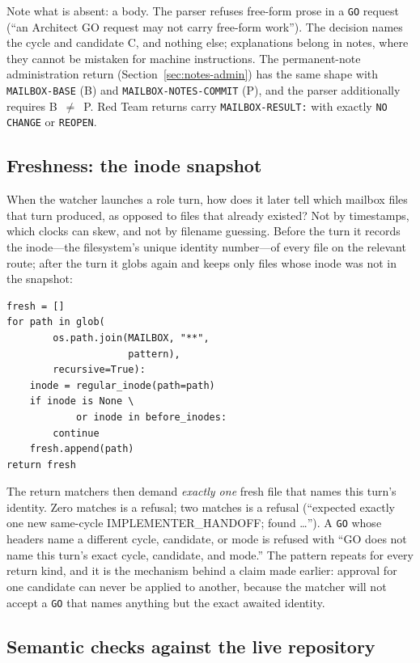 \documentclass[10pt,aps,prd,twocolumn,nofootinbib]{revtex4-2}
\newcommand{\code}[1]{\texttt{#1}}
\begin{document}
Note what is absent: a body.  The parser refuses free-form prose in a
\code{GO} request (``an Architect GO request may not carry free-form
work'').  The decision names the cycle and candidate C, and nothing
else; explanations belong in notes, where they cannot be mistaken for
machine instructions.  The permanent-note administration return
(Section~\ref{sec:notes-admin}) has the same shape with
\code{MAILBOX-BASE} (B) and \code{MAILBOX-NOTES-COMMIT} (P), and the
parser additionally requires B~$\neq$~P.  Red Team returns carry
\code{MAILBOX-RESULT:} with exactly \code{NO CHANGE} or \code{REOPEN}.

\subsection{Freshness: the inode snapshot}

When the watcher launches a role turn, how does it later tell which
mailbox files that turn produced, as opposed to files that already
existed?  Not by timestamps, which clocks can skew, and not by
filename guessing.  Before the turn it records the inode---the
filesystem's unique identity number---of every file on the relevant
route; after the turn it globs again and keeps only files whose inode
was not in the snapshot:

\begin{verbatim}
fresh = []
for path in glob(
        os.path.join(MAILBOX, "**",
                     pattern),
        recursive=True):
    inode = regular_inode(path=path)
    if inode is None \
            or inode in before_inodes:
        continue
    fresh.append(path)
return fresh
\end{verbatim}

The return matchers then demand \emph{exactly one} fresh file that
names this turn's identity.  Zero matches is a refusal; two matches is
a refusal (``expected exactly one new same-cycle
IMPLEMENTER\_HANDOFF; found \dots'').  A \code{GO} whose headers name
a different cycle, candidate, or mode is refused with ``GO does not
name this turn's exact cycle, candidate, and mode.''  The pattern
repeats for every return kind, and it is the mechanism behind a claim
made earlier: approval for one candidate can never be applied to
another, because the matcher will not accept a \code{GO} that names
anything but the exact awaited identity.

\subsection{Semantic checks against the live repository}
\end{document}
